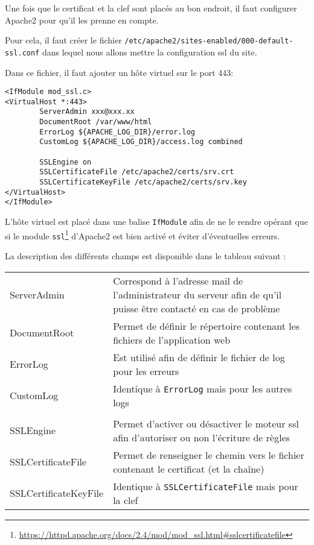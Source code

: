 Une fois que le certificat et la clef sont placés au bon endroit, il faut configurer Apache2 pour qu'il les prenne en compte.

Pour cela, il faut créer le fichier \texttt{/etc/apache2/sites-enabled/000-default-ssl.conf} dans lequel nous allons mettre la configuration ssl du site.

Dans ce fichier, il faut ajouter un hôte virtuel sur le port 443:
 
\begin{verbatim}
<IfModule mod_ssl.c>
<VirtualHost *:443>
        ServerAdmin xxx@xxx.xx
        DocumentRoot /var/www/html
        ErrorLog ${APACHE_LOG_DIR}/error.log
        CustomLog ${APACHE_LOG_DIR}/access.log combined

        SSLEngine on
        SSLCertificateFile /etc/apache2/certs/srv.crt
        SSLCertificateKeyFile /etc/apache2/certs/srv.key
</VirtualHost>
</IfModule>
\end{verbatim}
 

L'hôte virtuel est placé dans une balise \texttt{IfModule} afin de ne le rendre opérant que si le module \texttt{ssl}\footnote{\url{https://httpd.apache.org/docs/2.4/mod/mod\_ssl.html\#sslcertificatefile}} d'Apache2 est bien activé et éviter d'éventuelles erreurs.

La description des différents champs est disponible dans le tableau suivant :
 
    \begin{tabular}{l|p{10cm}}
        ServerAdmin & Correspond à l'adresse mail de l'administrateur du serveur afin de qu'il puisse être contacté en cas de problème\\
        DocumentRoot&Permet de définir le répertoire contenant les fichiers de l'application web\\
        ErrorLog & Est utilisé afin de définir le fichier de log pour les erreurs\\
        CustomLog & Identique à \texttt{ErrorLog} mais pour les autres logs\\
        &\\
        SSLEngine & Permet d'activer ou désactiver le moteur ssl afin d'autoriser ou non l'écriture de règles\\
        SSLCertificateFile & Permet de renseigner le chemin vers le fichier contenant le certificat (et la chaîne)\\
        SSLCertificateKeyFile & Identique à \texttt{SSLCertificateFile} mais pour la clef\\
    \end{tabular}
 

